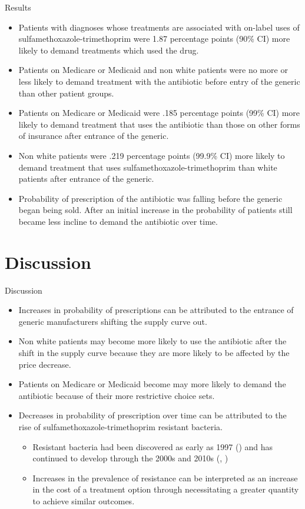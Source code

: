 \documentclass{beamer}
\begin{document}
\begin{frame}{Results}
\begin{itemize}
\item Patients with diagnoses whose treatments are associated with on-label uses of sulfamethoxazole-trimethoprim were 1.87 percentage points (90\% CI) more likely to demand treatments which used the drug.
\item Patients on Medicare or Medicaid and non white patients were no more or less likely to demand treatment with the antibiotic before entry of the generic than other patient groups.
\item Patients on Medicare or Medicaid were .185 percentage points (99\% CI) more likely to demand treatment that uses the antibiotic than those on other forms of insurance after entrance of the generic.
\item Non white patients were .219 percentage points (99.9\% CI) more likely to demand treatment that uses sulfamethoxazole-trimethoprim than white patients after entrance of the generic.
\item Probability of prescription of the antibiotic was falling before the generic began being sold. After an initial increase in the probability of patients still became less incline to demand the antibiotic over time.
\end{itemize}
\end{frame}

\section{Discussion}
\begin{frame}{Discussion}
\begin{itemize}
\item Increases in probability of prescriptions can be attributed to the entrance of generic manufacturers shifting the supply curve out.
\item Non white patients may become more likely to use the antibiotic after the shift in the supply curve because they are more likely to be affected by the price decrease.
\item Patients on Medicare or Medicaid become may more likely to demand the antibiotic because of their more restrictive choice sets.
\item  Decreases in probability of prescription over time can be attributed to the rise of sulfamethoxazole-trimethoprim resistant bacteria.
\begin{itemize}
  \item Resistant bacteria had been discovered as early as 1997 (\cite{gales_urinary_2002}) and has continued to develop through the 2000s and 2010s (\cite{noauthor_resistance_nodate}, \cite{khamash_increasing_2019})
  \item Increases in the prevalence of resistance can be interpreted as an increase in the cost of a treatment option through necessitating a greater quantity to achieve similar outcomes.
\end{itemize}
\end{itemize}
\end{frame}
\end{document}
